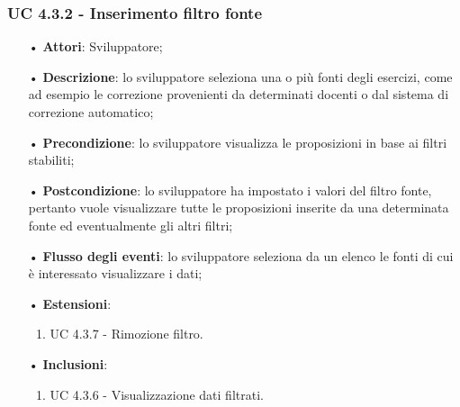\subsubsection{UC 4.3.2 - Inserimento filtro fonte}
\begin{itemize}
	\item[•]\textbf{Attori}: Sviluppatore;
	\item[•]\textbf{Descrizione}: lo sviluppatore seleziona una o più fonti degli esercizi, come ad esempio le correzione provenienti da determinati docenti o dal sistema di correzione automatico;
	\item[•]\textbf{Precondizione}: lo sviluppatore visualizza le proposizioni in base ai filtri stabiliti;
	\item[•]\textbf{Postcondizione}: lo sviluppatore ha impostato i valori del filtro fonte, pertanto vuole visualizzare tutte le proposizioni inserite da una determinata fonte ed eventualmente gli altri filtri;
	\item[•]\textbf{Flusso degli eventi}: lo sviluppatore seleziona da un elenco le fonti di cui è interessato visualizzare i dati;
	\item[•]\textbf{Estensioni}: 
	\begin{enumerate}
		\item UC 4.3.7 - Rimozione filtro.
	\end{enumerate}
	\item[•]\textbf{Inclusioni}:
	\begin{enumerate}
		\item UC 4.3.6 - Visualizzazione dati filtrati.
	\end{enumerate}
\end{itemize}

